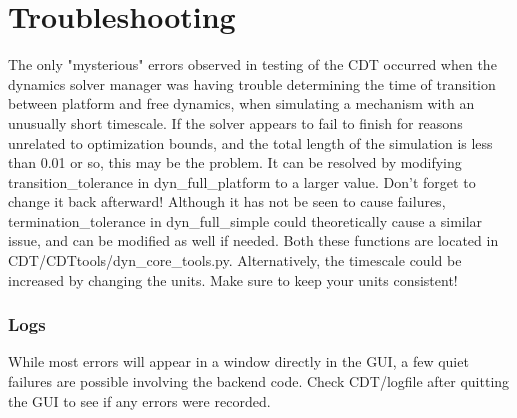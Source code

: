 \documentclass{article}
\begin{document}
\section{Troubleshooting}
The only "mysterious" errors observed in testing of the CDT occurred when the dynamics solver manager was having trouble determining the time of transition between platform and free dynamics, when simulating a mechanism with an unusually short timescale. If the solver appears to fail to finish for reasons unrelated to optimization bounds, and the total length of the simulation is less than 0.01 or so, this may be the problem. It can be resolved by modifying transition\_tolerance in dyn\_full\_platform to a larger value. Don't forget to change it back afterward! Although it has not be seen to cause failures, termination\_tolerance in dyn\_full\_simple could theoretically cause a similar issue, and can be modified as well if needed. Both these functions are located in CDT/CDTtools/dyn\_core\_tools.py. Alternatively, the timescale could be increased by changing the units. Make sure to keep your units consistent!
\subsubsection{Logs}
While most errors will appear in a window directly in the GUI, a few quiet failures are possible involving the backend code. Check CDT/logfile after quitting the GUI to see if any errors were recorded.
\end{document}

